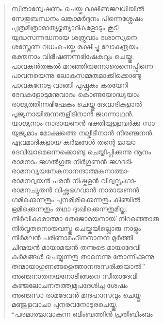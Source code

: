 \begin{verse}
സീതാന്വേഷണം ചെയ്തു ദക്ഷിണജലധിയില്‍\\
സേതുബന്ധനം ലങ്കാമര്‍ദ്ദനം പിന്നെശ്ശേഷം\\
പുത്രമിത്രാമാത്യഭൃത്യാദികളോടും കൂടി\\
യുദ്ധസന്നദ്ധനായ ശത്രുവാം ദശാസ്യനെ\\
ശസ്ത്രേണ വധംചെയ്തു രക്ഷിച്ചു ലോകത്രയം\\
ഭക്തനാം വിഭീഷണന്നഭിഷേകവും ചെയ്തു.\\
പാവകന്‍തങ്കല്‍ മറഞ്ഞിരുന്നോരെന്നെപ്പിന്നെ\\
പാവനയെന്നു ലോകസമ്മതമാക്കിക്കൊണ്ടു\\
പാവകനോടു വാങ്ങി പുഷ്പകം കരയേറി\\
ദേവകളോടുമനുവാദം കൊണ്ടയോദ്ധ്യയാം\\
രാജ്യത്തിന്നഭിഷേകം ചെയ്തു ദേവാദികളാല്‍\\
പൂജ്യനായിരുന്നരുളീടിനാന്‍ ജഗന്നാഥന്‍.\\
യാജ്യനാം നാരായണന്‍ ഭക്തിയുള്ളവര്‍ക്കു സാ-\\
യുജ്യമാം മോക്ഷത്തെ നല്കീടിനാന്‍ നിരഞ്ജനന്‍.\\
ഏവമാദികളായ കര്‍മങ്ങള്‍ തന്റെ മായാ-\\
ദേവിയാമെന്നെക്കൊണ്ടു ചെയ്യിപ്പിക്കുന്നു നൂനം\\
രാമനാം ജഗല്‍ഗുരു നിര്‍ഗുണന്‍ ജഗദഭി-\\
രാമനവ്യയനേകനാനന്ദാത്മകനാത്മാ-\\
രാമനദ്വയന്‍ പരന്‍ നിഷ്കളന്‍ വിദ്വദ്ഭൃംഗാ-\\
രാമനച്യുതന്‍ വിഷ്ണുഭഗവാന്‍ നാരായണന്‍\\
ഗമിക്കെന്നതും പുനരിരിക്കെന്നതും കിഞ്ചില്‍\\
ഭ്രമിക്കെന്നതും തഥാ ദുഃഖിക്കെന്നതുമില്ല.\\
നിര്‍വികാരാത്മാ തേജോമയനായ് നിറഞ്ഞൊരു\\
നിര്‍വൃതനൊരുവസ്തു ചെയ്കയില്ലൊരു നാളും\\
നിര്‍മലന്‍ പരിണാമഹീനനാനന്ദ മൂര്‍ത്തി\\
ചിന്മയന്‍ മായാമയന്‍ തന്നുടെ മായാദേവി\\
കര്‍മങ്ങള്‍ ചെയ്യുന്നതു താനെന്നു തോന്നിക്കുന്നു\\
തന്മായാഗുണങ്ങളെത്താനനുസരിക്കയാല്‍.”\\
അഞ്ജനാതനയനോടിങ്ങനെ സീതാദേവി\\
കഞ്ജലോചനതത്ത്വമുപദേശിച്ച ശേഷം\\
അഞ്ജസാ രാമദേവന്‍ മന്ദഹാസവും ചെയ്തു\\
മഞ്ജുളവാചാ പുനരവനോടുരചെയ്തു.\\
“പരമാത്മാവാകുന്ന ബിംബത്തിന്‍ പ്രതിബിംബം\\

\end{verse}
